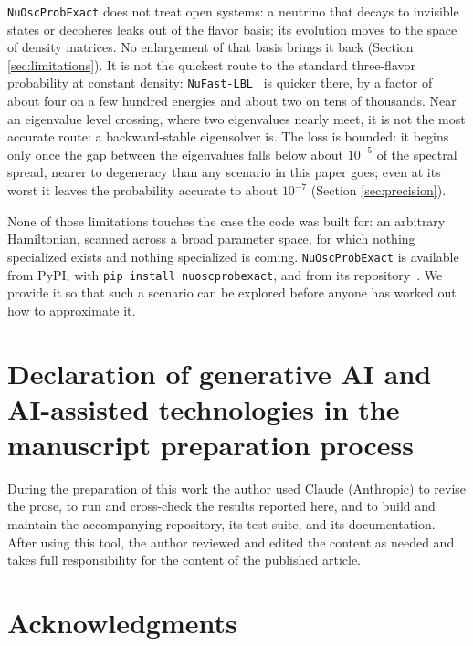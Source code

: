 \documentclass[final,5p,times,twocolumn,sort,compress]{elsarticle}
\begin{document}
{\tt NuOscProbExact} does not treat open systems: a neutrino that decays to invisible states or decoheres leaks out of the flavor basis; its evolution moves to the space of density matrices.  No enlargement of that basis brings it back (Section \ref{sec:limitations}).  It is not the quickest route to the standard three-flavor probability at constant density: {\tt NuFast-LBL}\ \cite{Denton:2024pzc} is quicker there, by a factor of about four on a few hundred energies and about two on tens of thousands.  Near an eigenvalue level crossing, where two eigenvalues nearly meet, it is not the most accurate route: a backward-stable eigensolver is.  The loss is bounded: it begins only once the gap between the eigenvalues falls below about $10^{-5}$ of the spectral spread, nearer to degeneracy than any scenario in this paper goes; even at its worst it leaves the probability accurate to about $10^{-7}$ (Section \ref{sec:precision}).

None of those limitations touches the case the code was built for: an arbitrary Hamiltonian, scanned across a broad parameter space, for which nothing specialized exists and nothing specialized is coming.  {\tt NuOscProbExact} is available from PyPI, with {\tt pip install nuoscprobexact}, and from its repository\ \cite{NuOscProbExact}.  We provide it so that such a scenario can be explored before anyone has worked out how to approximate it.


\section*{Declaration of generative AI and AI-assisted technologies in the manuscript preparation process}

During the preparation of this work the author used Claude (Anthropic) to revise the prose, to run and cross-check the results reported here, and to build and maintain the accompanying repository, its test suite, and its documentation. After using this tool, the author reviewed and edited the content as needed and takes full responsibility for the content of the published article.


\section*{Acknowledgments}
\end{document}
